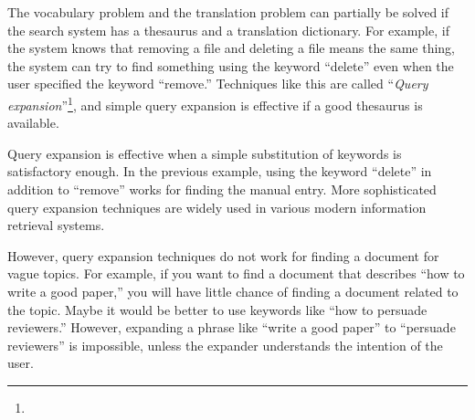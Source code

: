 \documentclass[manuscript,anonymous,review]{acmart}
\begin{document}
The vocabulary problem and the translation problem can partially be solved
if the search system has a thesaurus and a translation dictionary.
%
For example, 
if the system knows that removing a file and deleting a file means the same thing,
the system can try to find something using the keyword ``delete''
even when the user specified the keyword ``remove.''
%
Techniques like this are called ``\textit{Query expansion}''\footnote{
},
and simple query expansion is effective if a good thesaurus is available.

% 

Query expansion is effective when a simple substitution of keywords is satisfactory enough.
In the previous example, using the keyword ``delete'' in addition to ``remove'' works
for finding the manual entry.
More sophisticated query expansion techniques are widely used in various modern
information retrieval systems.

However, query expansion techniques do not work for finding a document for vague topics.
For example, if you want to find a document that describes ``how to write a good paper,''
you will have little chance of finding a document related to the topic.
Maybe it would be better to use keywords like ``how to persuade reviewers.''
However, expanding a phrase like ``write a good paper'' to ``persuade reviewers'' is impossible,
unless the expander understands the intention of the user.


\end{document}
